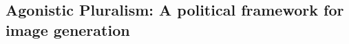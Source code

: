 









\subsection{Agonistic Pluralism: A political framework for image generation}
\label{agonistic-democracy}

